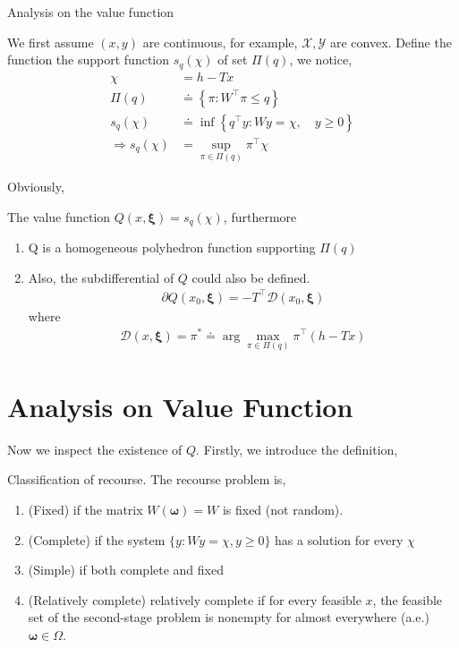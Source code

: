 \documentclass{beamerswitch}
\newcommand{\bxi}{\bm \xi}
\newcommand{\bo}{\bm \omega}
\begin{document}
\begin{frame}[allowframebreaks]{Analysis on the value function}


    We first assume \((x, y)\) are continuous, for example, \(\mathcal X, \mathcal Y\) are convex. Define the function the support function \(s_{q}(\chi)\) of set \(\Pi(q)\), we notice,
    \begin{align*}
        \chi                    & = h - Tx                                                        \\
        \Pi(q)                  & \doteq \left\{\pi: W^{\top} \pi \leq q\right\}                  \\
        s_{q}(\chi)             & \doteq \inf \left\{q^{\top} y: W y=\chi, \quad y \geq 0\right\} \\
        \Rightarrow s_{q}(\chi) & =\sup _{\pi \in \Pi(q)} \pi^{\top} \chi
    \end{align*}

    Obviously,
    \begin{theorem} The value function \(Q(x, \bxi) = s_q(\chi)\), furthermore
        \begin{enumerate}
            \item Q is a homogeneous polyhedron function supporting \(\Pi(q)\)
            \item Also, the subdifferential of \(Q\) could also be defined.
                  \begin{align*}
                      \partial Q\left(x_{0}, \bxi\right)=-T^{\top} \mathcal D \left(x_{0}, \bxi\right)
                  \end{align*}
                  where
                  \begin{align*}
                      \mathcal  D (x, \bxi) = \pi ^* \doteq \arg \max _{\pi \in \Pi(q)} \pi^{\top}(h-T x)
                  \end{align*}
        \end{enumerate}
    \end{theorem}
    \section{Analysis on Value Function}
    Now we inspect the existence of \(Q\). Firstly, we introduce the definition,
    \begin{definition}
        Classification of recourse.
        The recourse problem is,
        \begin{enumerate}[i]
            \item (Fixed) if the matrix \(W(\bo) = W\) is fixed (not random).
            \item (Complete) if the system \(\{y: Wy = \chi, y \ge 0\}\) has a solution for every \(\chi\)
            \item (Simple) if both complete and fixed
            \item (Relatively complete) relatively complete if for every feasible \(x\),
                  the feasible set of the second-stage problem is nonempty for almost everywhere (a.e.) \(\bm \omega \in \Omega\).
        \end{enumerate}
    \end{definition}


\end{frame}
\end{document}
